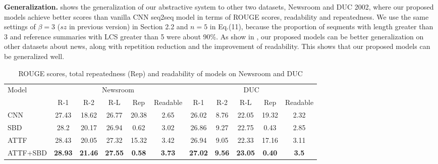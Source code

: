 \textbf{Generalization.} 
 shows the generalization of our abstractive system to other two datasets, Newsroom and DUC 2002, where our
proposed models achieve better scores than vanilla CNN seq2seq model in terms of ROUGE scores, readability and repeatedness. 
We use the same settings of $\beta=3$ ($sz$ in previous version) in Section 2.2 and $n=5$ in Eq.(11), because the proportion of seqments with length greater than 3 and reference summaries with LCS greater than 5 were about 90\%. As show in , our proposed models can be better generalization on other datasets about news, along with repetition reduction and the improvement of readability.
This shows that our proposed models can be generalized well.
\begin{table}[th!]
	\begin{center}
		\caption{ROUGE scores, total repeatedness (Rep) and readability of models on Newsroom and DUC}
		\begin{tabular}{|l|c|c|c|c|c|c|c|c|c|c|}
			\hline
			\multirow{2}{*}{Model} & \multicolumn{5}{|c|}{Newsroom} &\multicolumn{5}{|c|}{DUC} \\
			\cline{2-11}
			&R-1 & R-2 & R-L& Rep & Readable &R-1 & R-2 & R-L & Rep & Readable\\
			\hline
			CNN &  27.43 & 18.62 & 26.77 & 20.38 & 2.65 & 26.02 & 8.76 & 22.05& 19.32 & 2.32 \\
            SBD &  28.2 & 20.17 & 26.94 & 0.62 & 3.02 & 26.86 & 9.27 & 22.75& 0.43 & 2.85 \\
            ATTF &  28.43 & 20.05 & 27.32 & 15.32 & 3.42 & 26.94 & 9.05 & 22.33& 17.16 & 3.11 \\
			ATTF+SBD &  \bf 28.93& \bf 21.46 & \bf 27.55 & \bf 0.58 & \bf 3.73 & \bf 27.02 & \bf 9.56 & \bf 23.05& \bf 0.40 & \bf 3.5 \\
			\hline
		\end{tabular}
		\label{tab:generalization}
	\end{center}
\end{table}


